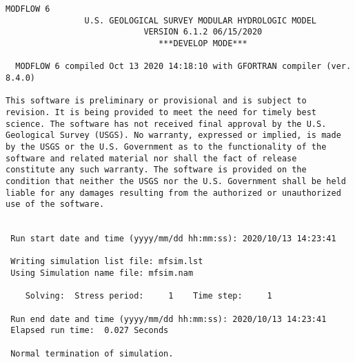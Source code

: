 {\small
\begin{lstlisting}[style=modeloutput]
                                   MODFLOW 6
                U.S. GEOLOGICAL SURVEY MODULAR HYDROLOGIC MODEL
                            VERSION 6.1.2 06/15/2020
                               ***DEVELOP MODE***

  MODFLOW 6 compiled Oct 13 2020 14:18:10 with GFORTRAN compiler (ver. 8.4.0)

This software is preliminary or provisional and is subject to 
revision. It is being provided to meet the need for timely best 
science. The software has not received final approval by the U.S. 
Geological Survey (USGS). No warranty, expressed or implied, is made 
by the USGS or the U.S. Government as to the functionality of the 
software and related material nor shall the fact of release 
constitute any such warranty. The software is provided on the 
condition that neither the USGS nor the U.S. Government shall be held 
liable for any damages resulting from the authorized or unauthorized 
use of the software.


 Run start date and time (yyyy/mm/dd hh:mm:ss): 2020/10/13 14:23:41

 Writing simulation list file: mfsim.lst
 Using Simulation name file: mfsim.nam

    Solving:  Stress period:     1    Time step:     1

 Run end date and time (yyyy/mm/dd hh:mm:ss): 2020/10/13 14:23:41
 Elapsed run time:  0.027 Seconds

 Normal termination of simulation.
\end{lstlisting}
}
